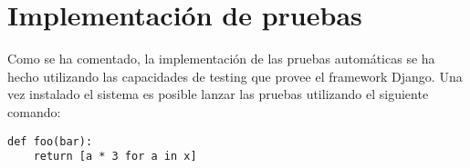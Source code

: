\section{Implementación de pruebas}

Como se ha comentado, la implementación de las pruebas automáticas se ha hecho
utilizando las capacidades de testing que provee el framework Django. Una vez
instalado el sistema es posible lanzar las pruebas utilizando el siguiente comando:

\begin{verbatim}
def foo(bar):
    return [a * 3 for a in x]

\end{verbatim}

